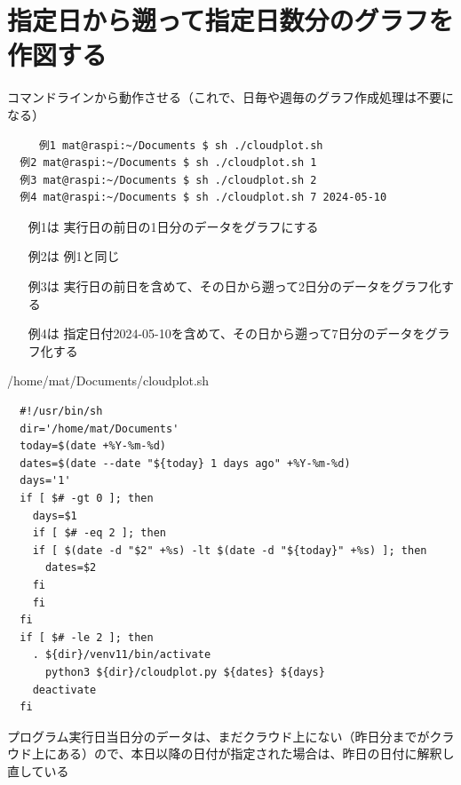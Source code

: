\documentclass[12pt,a4j]{jsbook}
\begin{document}
\section{指定日から遡って指定日数分のグラフを作図する}

コマンドラインから動作させる（これで、日毎や週毎のグラフ作成処理は不要になる）

\begin{spacing}{0.95}
\begin{screen}
\begin{verbatim}
	 例1 mat@raspi:~/Documents $ sh ./cloudplot.sh
  例2 mat@raspi:~/Documents $ sh ./cloudplot.sh 1
  例3 mat@raspi:~/Documents $ sh ./cloudplot.sh 2
  例4 mat@raspi:~/Documents $ sh ./cloudplot.sh 7 2024-05-10
\end{verbatim}
\end{screen}
\end{spacing}

\begin{itemize}
\item[例1は] 実行日の前日の1日分のデータをグラフにする
\item[例2は] 例1と同じ
\item[例3は] 実行日の前日を含めて、その日から遡って2日分のデータをグラフ化する
\item[例4は] 指定日付2024-05-10を含めて、その日から遡って7日分のデータをグラフ化する
\end{itemize}

\begin{spacing}{0.95}
\begin{itembox}[l]{/home/mat/Documents/cloudplot.sh}
\begin{verbatim}
  #!/usr/bin/sh
  dir='/home/mat/Documents'
  today=$(date +%Y-%m-%d)
  dates=$(date --date "${today} 1 days ago" +%Y-%m-%d)
  days='1'
  if [ $# -gt 0 ]; then
    days=$1
    if [ $# -eq 2 ]; then
    if [ $(date -d "$2" +%s) -lt $(date -d "${today}" +%s) ]; then
      dates=$2
    fi
    fi
  fi
  if [ $# -le 2 ]; then
    . ${dir}/venv11/bin/activate
      python3 ${dir}/cloudplot.py ${dates} ${days}
    deactivate
  fi
\end{verbatim}
\end{itembox}
\end{spacing}

\newpage

プログラム実行日当日分のデータは、まだクラウド上にない（昨日分までがクラウド上にある）ので、本日以降の日付が指定された場合は、昨日の日付に解釈し直している
\end{document}
